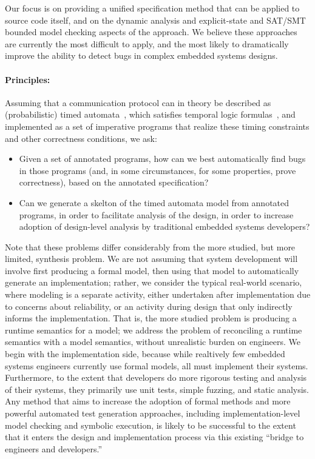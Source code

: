 Our focus is on providing a unified specification method that can be
applied to source code itself, and on the dynamic analysis and
explicit-state and SAT/SMT bounded model
checking aspects of the approach.  We believe these approaches are
currently the most difficult to apply, and the most likely to
dramatically improve the ability to detect bugs in complex embedded
systems designs.

\paragraph{Principles:} Assuming that a communication protocol can in theory be described
as (probabilistic) timed automata~\cite{AD1994:TCS},
which satisfies temporal logic
formulas~\cite{BLM2017:LNCS}, and implemented as a set of
imperative programs that realize these timing constraints and other
correctness conditions, we ask:
\begin{itemize}[labelsep=3pt,leftmargin=12pt]
\item Given a set of annotated programs, how can we best automatically
  find bugs in those programs (and, in some circumstances, for some
  properties, prove correctness), based on the annotated
  specification?
\item Can we generate a skelton of the timed automata model from 
  annotated programs, in order to facilitate analysis of the design, 
  in order to increase adoption of design-level analysis by 
  traditional embedded systems developers? 
\end{itemize}

Note that these problems differ considerably from the more studied,
but more limited, synthesis problem.  We are not assuming that
system development will involve first producing a formal model, then
using that model to automatically generate an implementation; rather,
we consider the typical real-world scenario, where modeling is a
separate activity, either undertaken after implementation due to
concerns about reliability, or an activity during design that only
indirectly informs the implementation.  That is, the more studied
problem is producing a runtime semantics for a model; we address the
problem of reconciling a runtime semantics with a model semantics,
without unrealistic burden on engineers.  We begin with the
implementation side, because while realtively few embedded systems
engineers currently use formal models, all must implement their
systems.  Furthermore, to the extent that developers do more rigorous
testing and analysis of their systems, they primarily use unit tests, simple
fuzzing, and static analysis.  Any method that aims to increase the
adoption of formal methods and more powerful automated test generation
approaches, including implementation-level model checking and symbolic
execution, is likely to be successful to the extent that it enters the
design and implementation process via this existing ``bridge to
engineers and developers.''


